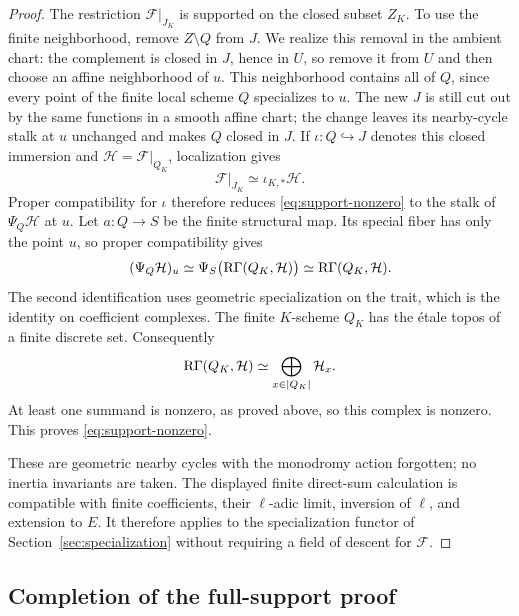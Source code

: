 \begin{proof}
The restriction $\mathcal F|_{J_K}$ is supported on the closed subset
$Z_K$.  To use the finite neighborhood, remove $Z\setminus Q$ from
$J$.  We realize this removal in the ambient chart: the complement is
closed in $J$, hence in $U$, so remove it from $U$ and then choose an
affine neighborhood of $u$.  This neighborhood contains all of $Q$,
since every point of the finite local scheme $Q$ specializes to $u$.
The new $J$ is still cut out by the same functions in a smooth affine
chart; the change leaves its nearby-cycle stalk at $u$ unchanged and
makes $Q$ closed in $J$.  If $\iota:Q\hookrightarrow J$ denotes this
closed immersion and $\mathcal H=\mathcal F|_{Q_K}$, localization gives
\[
 \mathcal F|_{J_K}\simeq\iota_{K,*}\mathcal H.
\]
Proper compatibility for $\iota$ therefore reduces
\eqref{eq:support-nonzero} to the stalk of $\Psi_Q\mathcal H$ at $u$.
Let $a:Q\to S$ be the finite structural map.  Its special fiber has
only the point $u$, so proper compatibility gives
\[
 (\Psi_Q\mathcal H)_u
 \simeq \Psi_S\bigl(\operatorname{R\Gamma}(Q_K,\mathcal H)\bigr)
 \simeq \operatorname{R\Gamma}(Q_K,\mathcal H).
\]
The second identification uses geometric specialization on the trait,
which is the identity on coefficient complexes.  The finite $K$-scheme
$Q_K$ has the \'etale topos of a finite discrete set.  Consequently
\[
 \operatorname{R\Gamma}(Q_K,\mathcal H)
   \simeq\bigoplus_{x\in|Q_K|}\mathcal H_x.
\]
At least one summand is nonzero, as proved above, so this complex is
nonzero.  This proves \eqref{eq:support-nonzero}.

These are geometric nearby cycles with the monodromy action forgotten;
no inertia invariants are taken.  The displayed finite direct-sum
calculation is compatible with finite coefficients, their
$\ell$-adic limit, inversion of $\ell$, and extension to $E$.
It therefore applies to the specialization functor of
Section~\ref{sec:specialization} without requiring a field of descent
for $\mathcal F$.
\end{proof}

\subsection{Completion of the full-support proof}

